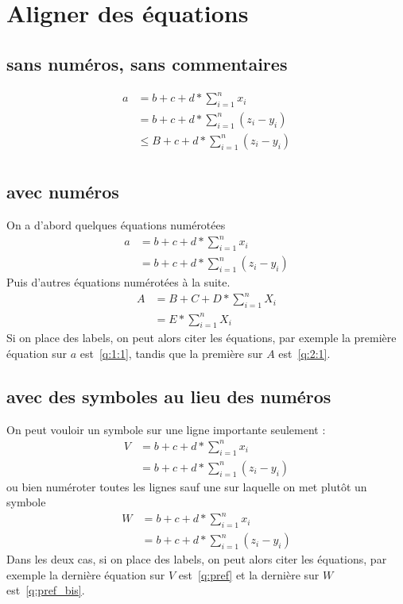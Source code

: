 \documentclass[12pt,a4paper,fleqn]{article}
\begin{document}
\newpage
\section{Aligner  des équations}
\subsection{sans numéros, sans commentaires}
\begin{align*}
a 
& = b+c+d * \sum_{i=1}^n x_i\\
& = b+c+d * \sum_{i=1}^n (z_i - y_i)\\
& \leqslant B+c+d * \sum_{i=1}^n (z_i - y_i)\\
\end{align*}

\subsection{avec numéros}
On a d'abord quelques équations numérotées
\begin{align}
a 
& = b+c+d * \sum_{i=1}^n x_i \label{q:1:1}\\
& = b+c+d * \sum_{i=1}^n (z_i - y_i)
\end{align}
Puis d'autres équations numérotées à la suite.
\begin{align}
A
& = B+C+D * \sum_{i=1}^n X_i \label{q:2:1}\\
& = E * \sum_{i=1}^n X_i
\end{align}
Si on place des labels, on peut alors citer les équations, par exemple la première équation sur $a$ est~\eqref{q:1:1}, tandis que la première sur $A$ est~\eqref{q:2:1}.

\subsection{avec des symboles au lieu des numéros}
On peut vouloir un symbole sur une ligne importante seulement :
\begin{align*}
V 
& = b+c+d * \sum_{i=1}^n x_i  \\
& = b+c+d * \sum_{i=1}^n (z_i - y_i) \tag{$\bigstar$}  \label{q:pref}
\end{align*}
ou bien numéroter toutes les lignes sauf une sur laquelle on met plutôt un symbole 
\begin{align}
W
& = b+c+d * \sum_{i=1}^n x_i  \\
& = b+c+d * \sum_{i=1}^n (z_i - y_i) \tag{$\clubsuit$}  \label{q:pref_bis}
\end{align}
Dans les deux cas, si on place des labels, on peut alors citer les équations, par exemple la dernière équation sur $V$ est~\eqref{q:pref} et la dernière  sur $W$ est~\eqref{q:pref_bis}.
\end{document}
